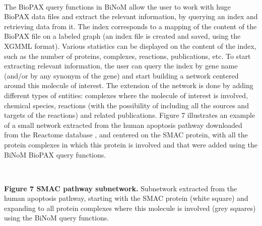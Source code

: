 \documentclass[11pt]{bmc_article_s50}
\newenvironment{bmcformat}{\begin{raggedright}\baselineskip20pt\sloppy\setboolean{publ}{false}}{\end{raggedright}\baselineskip20pt\sloppy}
\begin{document}
\begin{bmcformat}
\vspace*{-21pt}

\hrulefill\

The BioPAX query functions in BiNoM allow the user to work with huge
BioPAX data files and extract the relevant information, by querying an index and
retrieving data from it. The index corresponds to a mapping of the content of
the BioPAX file on a labeled graph (an index file is created and saved, using
the XGMML format). Various statistics can be displayed on the content of the
index, such as the number of proteins, complexes, reactions, publications, etc.
To start extracting relevant information, the user can query the index by gene
name (and/or by any synonym of the gene) and start building a network centered
around this molecule of interest. The extension of the network is done by adding
different types of entities: complexes where the molecule of interest is
involved, chemical species, reactions (with the possibility of including all the
sources and targets of the reactions) and related publications. Figure 7
illustrates an example of a small network extracted from the human apoptosis
pathway downloaded from the Reactome database \cite{joshi2005reactome}, and
centered on the SMAC protein, with all the protein complexes in which
this protein is involved and that were added using the BiNoM BioPAX query functions.

\hrulefill\

\vspace*{-15pt}
\textbf{Figure 7 SMAC pathway subnetwork.}
Subnetwork extracted from the human apoptosis pathway, starting with the
SMAC protein (white square) and expanding to all protein complexes where this
molecule is involved (grey squares) using the BiNoM query functions.

\vspace*{-21pt}

\hrulefill\



\end{bmcformat}
\end{document}
